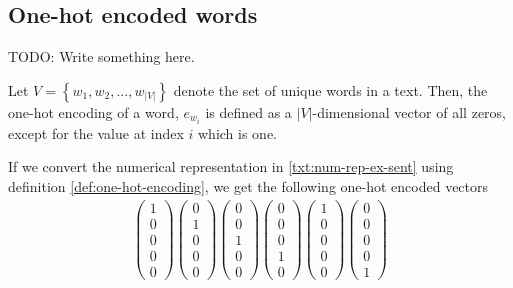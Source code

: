 \subsection{One-hot encoded words}
TODO: Write something here.
\begin{definition}
Let $V = \left \{ w_1, w_2, ..., w_{|V|} \right \}$ denote the set of unique words in a text. Then, the one-hot encoding of a word, $e_{w_i}$ is defined as a $|V|$-dimensional vector of all zeros, except for the value at index $i$ which is one. \label{def:one-hot-encoding}
\end{definition}

\noindent
If we convert the numerical representation in \ref{txt:num-rep-ex-sent} using definition \ref{def:one-hot-encoding}, we get the following one-hot encoded vectors
\begin{align}
    \begin{pmatrix}
    1\\
    0\\
    0\\
    0\\
    0
    \end{pmatrix}
    \begin{pmatrix}
    0\\
    1\\
    0\\
    0\\
    0
    \end{pmatrix}
    \begin{pmatrix}
    0\\
    0\\
    1\\
    0\\
    0
    \end{pmatrix}
    \begin{pmatrix}
    0\\
    0\\
    0\\
    1\\
    0
    \end{pmatrix}
    \begin{pmatrix}
    1\\
    0\\
    0\\
    0\\
    0
    \end{pmatrix}
    \begin{pmatrix}
    0\\
    0\\
    0\\
    0\\
    1
    \end{pmatrix}
\end{align}

